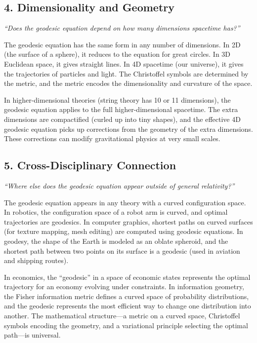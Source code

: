 \documentclass[11pt,openright]{book}
\begin{document}
\subsection*{4. Dimensionality and Geometry}
\textit{``Does the geodesic equation depend on how many dimensions spacetime has?''}

The geodesic equation has the same form in any number of dimensions. In 2D (the surface of a sphere), it reduces to the equation for great circles. In 3D Euclidean space, it gives straight lines. In 4D spacetime (our universe), it gives the trajectories of particles and light. The Christoffel symbols are determined by the metric, and the metric encodes the dimensionality and curvature of the space.

In higher-dimensional theories (string theory has 10 or 11 dimensions), the geodesic equation applies to the full higher-dimensional spacetime. The extra dimensions are compactified (curled up into tiny shapes), and the effective 4D geodesic equation picks up corrections from the geometry of the extra dimensions. These corrections can modify gravitational physics at very small scales.

\subsection*{5. Cross-Disciplinary Connection}
\textit{``Where else does the geodesic equation appear outside of general relativity?''}

The geodesic equation appears in any theory with a curved configuration space. In robotics, the configuration space of a robot arm is curved, and optimal trajectories are geodesics. In computer graphics, shortest paths on curved surfaces (for texture mapping, mesh editing) are computed using geodesic equations. In geodesy, the shape of the Earth is modeled as an oblate spheroid, and the shortest path between two points on its surface is a geodesic (used in aviation and shipping routes).

In economics, the ``geodesic'' in a space of economic states represents the optimal trajectory for an economy evolving under constraints. In information geometry, the Fisher information metric defines a curved space of probability distributions, and the geodesic represents the most efficient way to change one distribution into another. The mathematical structure---a metric on a curved space, Christoffel symbols encoding the geometry, and a variational principle selecting the optimal path---is universal.
\end{document}
